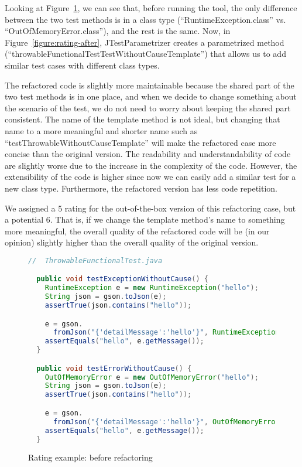 Looking at Figure~\ref{figure:rating-before}, we can see that, before running the tool, the only difference between the two test methods is in a class type (``RuntimeException.class'' vs. ``OutOfMemoryError.class''), and the rest is the same. Now, in Figure~\ref{figure:rating-after}, JTestParametrizer creates a parametrized method (``throwableFunctionalTestTestWithoutCauseTemplate'') that allows us to add similar test cases with different class types.

The refactored code is slightly more maintainable because the shared part of the two test methods is in one place, and when we decide to change something about the scenario of the test, we do not need to worry about keeping the shared part consistent.
The name of the template method is not ideal, but changing that name to a more meaningful and shorter name such as ``testThrowableWithoutCauseTemplate'' will make the refactored case more concise than the original version.
The readability and understandability of code are slightly worse due to the increase in the complexity of the code.
However, the extensibility of the code is higher since now we can easily add a similar test for a new class type. Furthermore, the refactored version has less code repetition.

We assigned a 5 rating for the out-of-the-box version of this refactoring case, but a potential 6. That is, if we change the template method's name to something more meaningful, the overall quality of the refactored code will be (in our opinion) slightly higher than the overall quality of the original version.

\begin{figure}
\begin{lstlisting}[language=Java]
  //  ThrowableFunctionalTest.java

  public void testExceptionWithoutCause() {
    RuntimeException e = new RuntimeException("hello");
    String json = gson.toJson(e);
    assertTrue(json.contains("hello"));

    e = gson.
      fromJson("{'detailMessage':'hello'}", RuntimeException.class);
    assertEquals("hello", e.getMessage());
  }

  public void testErrorWithoutCause() {
    OutOfMemoryError e = new OutOfMemoryError("hello");
    String json = gson.toJson(e);
    assertTrue(json.contains("hello"));

    e = gson.
      fromJson("{'detailMessage':'hello'}", OutOfMemoryError.class);
    assertEquals("hello", e.getMessage());
  }
\end{lstlisting}
\caption{Rating example: before refactoring}
\label{figure:rating-before}
\end{figure}

